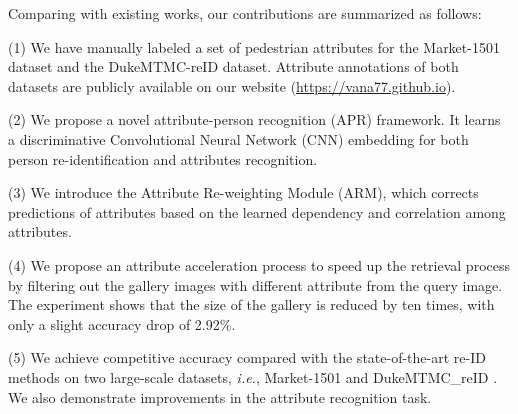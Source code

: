 \documentclass[5p,times,twocolumn]{elsarticle}
\begin{document}
Comparing with existing works, our contributions are summarized as follows:
    
(1) We have manually labeled a set of pedestrian attributes for the Market-1501 dataset and the DukeMTMC-reID dataset. Attribute annotations of both datasets are publicly available on our website (\url{https://vana77.github.io}).
        
(2) We propose a novel attribute-person recognition (APR) framework. It learns a discriminative Convolutional Neural Network (CNN) embedding for both person re-identification and attributes recognition. 
    
(3) We introduce the Attribute Re-weighting Module (ARM), which corrects predictions of attributes based on the learned dependency and correlation among attributes.

(4) We propose an attribute acceleration process to speed up the retrieval process by filtering out the gallery images with different attribute from the query image. The experiment shows that the size of the gallery is reduced by ten times, with only a slight accuracy drop of 2.92\%.
    
(5) We achieve competitive accuracy compared with the state-of-the-art re-ID methods on two large-scale datasets, \emph{i.e.}, Market-1501 \citep{Zheng_2015_ICCV} and DukeMTMC\_reID \citep{zheng2017discriminatively}. We also demonstrate improvements in the attribute recognition task. 
    
\end{document}
